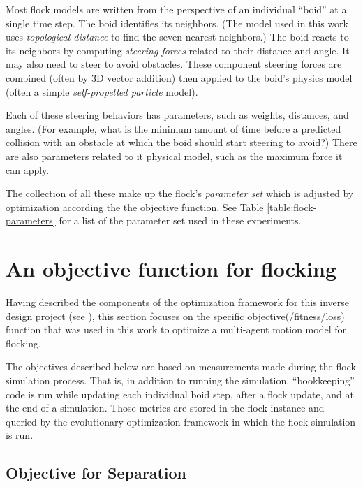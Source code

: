 \documentclass[letterpaper]{article}
\begin{document}
Most flock models are written from the perspective of an individual ``boid'' at a single time step. The boid identifies its neighbors. (The model used in this work uses \textit{topological distance} to find the seven nearest neighbors.) The boid reacts to its neighbors by computing \textit{steering forces} related to their distance and angle. It may also need to steer to avoid obstacles. These component steering forces are combined (often by 3D vector addition) then applied to the boid's physics model (often a simple \textit{self-propelled particle} model).

Each of these steering behaviors has parameters, such as weights, distances, and angles. (For example, what is the minimum amount of time before a predicted collision with an obstacle at which the boid should start steering to avoid?) There are also parameters related to it physical model, such as the maximum force it can apply.

The collection of all these make up the flock's \textit{parameter set} which is adjusted by optimization according the the objective function. See Table \ref{table:flock-parameters} for a list of the parameter set used in these experiments.



\section{An objective function for flocking}
\label{sec:FlockingObjective}

Having described the components of the optimization framework for this inverse design project (see ), this section focuses on the specific objective(/fitness/loss) function that was used in this work to optimize a multi-agent motion model for flocking.

The objectives described below are based on measurements made during the flock simulation process. That is, in addition to running the simulation, ``bookkeeping'' code is run while updating each individual boid step, after a flock update, and at the end of a simulation. Those metrics are stored in the flock instance and queried by the evolutionary optimization framework in which the flock simulation is run.

\subsection{Objective for Separation}
\label{subsec:separation_objective}
\end{document}

